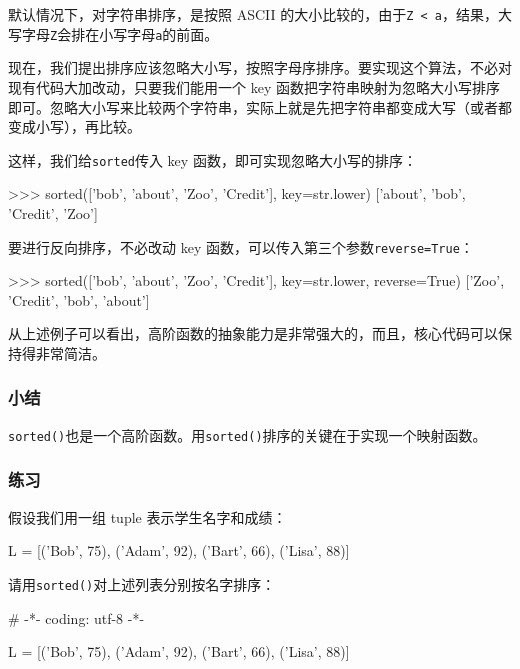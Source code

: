 默认情况下，对字符串排序，是按照 ASCII
的大小比较的，由于\texttt{\textquotesingle{}Z\textquotesingle{}\ \textless{}\ \textquotesingle{}a\textquotesingle{}}，结果，大写字母\texttt{Z}会排在小写字母\texttt{a}的前面。

现在，我们提出排序应该忽略大小写，按照字母序排序。要实现这个算法，不必对现有代码大加改动，只要我们能用一个
key
函数把字符串映射为忽略大小写排序即可。忽略大小写来比较两个字符串，实际上就是先把字符串都变成大写（或者都变成小写），再比较。

这样，我们给\texttt{sorted}传入 key 函数，即可实现忽略大小写的排序：

\begin{pythoncode}
>>> sorted(['bob', 'about', 'Zoo', 'Credit'], key=str.lower)
['about', 'bob', 'Credit', 'Zoo']
\end{pythoncode}

要进行反向排序，不必改动 key
函数，可以传入第三个参数\texttt{reverse=True}：

\begin{pythoncode}
>>> sorted(['bob', 'about', 'Zoo', 'Credit'], key=str.lower, reverse=True)
['Zoo', 'Credit', 'bob', 'about']
\end{pythoncode}

从上述例子可以看出，高阶函数的抽象能力是非常强大的，而且，核心代码可以保持得非常简洁。

\hypertarget{ux5c0fux7ed3}{%
\subsubsection{小结}\label{ux5c0fux7ed3}}

\texttt{sorted()}也是一个高阶函数。用\texttt{sorted()}排序的关键在于实现一个映射函数。

\hypertarget{ux7ec3ux4e60}{%
\subsubsection{练习}\label{ux7ec3ux4e60}}

假设我们用一组 tuple 表示学生名字和成绩：

\begin{pythoncode}
L = [('Bob', 75), ('Adam', 92), ('Bart', 66), ('Lisa', 88)]
\end{pythoncode}

请用\texttt{sorted()}对上述列表分别按名字排序：

\begin{pythoncode}
# -*- coding: utf-8 -*-

L = [('Bob', 75), ('Adam', 92), ('Bart', 66), ('Lisa', 88)]
\end{pythoncode}

